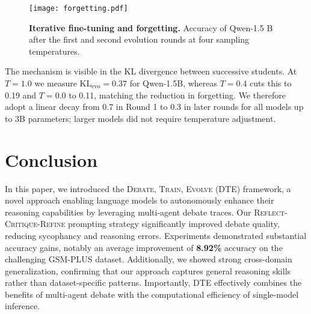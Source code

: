 \documentclass[11pt]{article}
\begin{document}
\begin{figure}[t]
    \centering
    \texttt{[image: forgetting.pdf]}
    \caption{\textbf{Iterative fine-tuning and forgetting.}  
    Accuracy of Qwen-1.5 B after the first and second evolution rounds at four sampling temperatures.}

    \label{fig:forget}
\end{figure}

The mechanism is visible in the KL divergence between successive students. At \(T=1.0\) we measure \(\text{KL}_{\text{evo}}{=}0.37\) for Qwen-1.5B, whereas \(T=0.4\) cuts this to 0.19 and \(T=0.0\) to 0.11, matching the reduction in forgetting. We therefore adopt a linear decay from 0.7 in Round 1 to 0.3 in later rounds for all models up to 3B parameters; larger models did not require temperature adjustment.


\section{Conclusion}

In this paper, we introduced the \textsc{Debate, Train, Evolve (DTE)} framework, a novel approach enabling language models to autonomously enhance their reasoning capabilities by leveraging multi-agent debate traces. Our \textsc{Reflect-Critique-Refine} prompting strategy significantly improved debate quality, reducing sycophancy and reasoning errors. Experiments demonstrated substantial accuracy gains, notably an average improvement of \textbf{8.92\%} accuracy on the challenging GSM-PLUS dataset. Additionally, we showed strong cross-domain generalization, confirming that our approach captures general reasoning skills rather than dataset-specific patterns. Importantly, DTE effectively combines the benefits of multi-agent debate with the computational efficiency of single-model inference.
\end{document}
